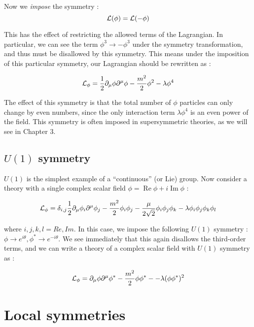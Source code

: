 Now we \textit{impose} the symmetry :
\begin{equation}
\mathcal{L}(\phi) = \mathcal{L}(- \phi)
\end{equation}

This has the effect of restricting the allowed terms of the Lagrangian.
In particular, we can see the term $\phi^3 \rightarrow - \phi^3$ under the symmetry transformation, and thus must be disallowed by this symmetry.
This means under the imposition of this particular symmetry, our Lagrangian should be rewritten as :

\begin{equation}
\mathcal{L}_\phi = \frac{1}{2} \partial_\mu \phi \partial^\mu \phi - \frac{m^2}{2} \phi^2  - \lambda \phi^4
\end{equation}

The effect of this symmetry is that the total number of  $\phi$ particles can only change by even numbers, since the only interaction term $\lambda \phi^4$ is an even power of the field.
This symmetry is often imposed in supersymmetric theories, as we will see in Chapter 3.

\subsection{$U(1)$ symmetry}

$U(1)$ is the simplest example of a ``continuous'' (or Lie) group.
Now consider a theory with a single complex scalar field $\phi = \operatorname{Re}\phi + i \operatorname{Im}\phi$ :

\begin{equation}
\mathcal{L}_\phi = \delta_{i,j} \frac{1}{2} \partial_\mu \phi_i \partial^\mu \phi_j - \frac{m^2}{2} \phi_i \phi_j - \frac{\mu}{2 \sqrt{2}}  \phi_i \phi_j \phi_k  - \lambda \phi_i \phi_j \phi_k \phi_l
\end{equation}

where $i,j,k,l = Re, Im$.
In this case, we impose the following $U(1)$ symmetry : $\phi \rightarrow e^{i\theta}, \phi^* \rightarrow e^{-i\theta} $.
We see immediately that this again disallows the third-order terms, and we can write a theory of a complex scalar field with $U(1)$ symmetry as :

\begin{equation}
\mathcal{L}_\phi =  \partial_\mu \phi \partial^\mu \phi^* - \frac{m^2}{2} \phi \phi^* -   - \lambda (\phi \phi^*)^2
\end{equation}

\section{Local symmetries}

